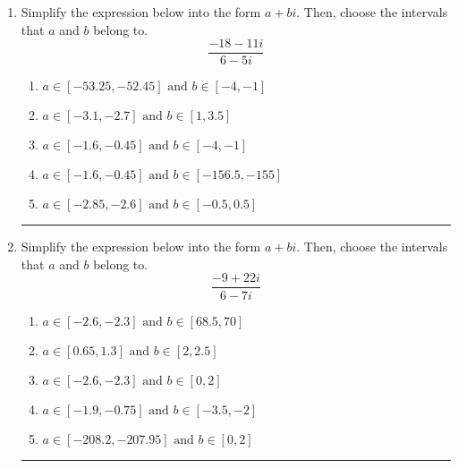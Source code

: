 \documentclass[14pt]{extbook}
\newcommand{\litem}[1]{\item#1\hspace*{-1cm}\rule{\textwidth}{0.4pt}}
\begin{document}
\begin{enumerate}
{\begin{enumerate}[label=\Alph*.]
\end{enumerate} }
\litem{
Simplify the expression below into the form $a+bi$. Then, choose the intervals that $a$ and $b$ belong to.\[ \frac{-18 - 11 i}{6 - 5 i} \]\begin{enumerate}[label=\Alph*.]
\item \( a \in [-53.25, -52.45] \text{ and } b \in [-4, -1] \)
\item \( a \in [-3.1, -2.7] \text{ and } b \in [1, 3.5] \)
\item \( a \in [-1.6, -0.45] \text{ and } b \in [-4, -1] \)
\item \( a \in [-1.6, -0.45] \text{ and } b \in [-156.5, -155] \)
\item \( a \in [-2.85, -2.6] \text{ and } b \in [-0.5, 0.5] \)

\end{enumerate} }
\litem{
Simplify the expression below into the form $a+bi$. Then, choose the intervals that $a$ and $b$ belong to.\[ \frac{-9 + 22 i}{6 - 7 i} \]\begin{enumerate}[label=\Alph*.]
\item \( a \in [-2.6, -2.3] \text{ and } b \in [68.5, 70] \)
\item \( a \in [0.65, 1.3] \text{ and } b \in [2, 2.5] \)
\item \( a \in [-2.6, -2.3] \text{ and } b \in [0, 2] \)
\item \( a \in [-1.9, -0.75] \text{ and } b \in [-3.5, -2] \)
\item \( a \in [-208.2, -207.95] \text{ and } b \in [0, 2] \)

\end{enumerate} }
\end{enumerate}
\end{document}

